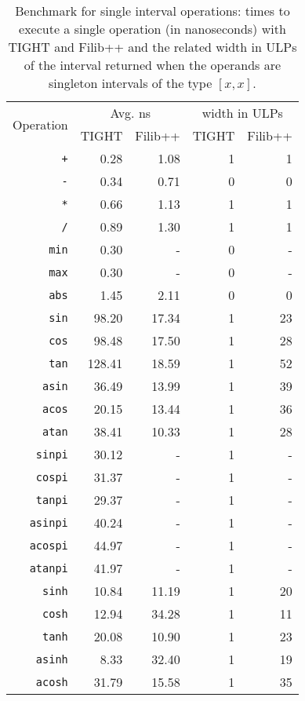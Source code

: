 
\begin{table}
\centering
\label{table:benchmarks}
\caption{Benchmark for single interval operations: times to execute a single operation (in nanoseconds) with TIGHT and Filib++ and the related width in ULPs of the interval returned when the operands are singleton intervals of the type $[x,x]$.}
\begin{tabular}{r|rr|rr}
\multirow{2}{*}{Operation} & \multicolumn{2}{c|}{Avg. ns} & \multicolumn{2}{c}{width in ULPs} \\
& TIGHT & Filib++ & TIGHT & Filib++ \\
\hline
\texttt{+} & 0.28 & 1.08 & 1 & 1 \\
\texttt{-} & 0.34 & 0.71 & 0 & 0 \\
\texttt{*} & 0.66 & 1.13 & 1 & 1 \\
\texttt{/} & 0.89 & 1.30 & 1 & 1 \\
\texttt{min} & 0.30 & - & 0 & - \\
\texttt{max} & 0.30 & - & 0 & - \\
\texttt{abs} & 1.45 & 2.11 & 0 & 0 \\
\texttt{sin} & 98.20 & 17.34 & 1 & 23 \\
\texttt{cos} & 98.48 & 17.50 & 1 & 28 \\
\texttt{tan} & 128.41 & 18.59 & 1 & 52 \\
\texttt{asin} & 36.49 & 13.99 & 1 & 39 \\
\texttt{acos} & 20.15 & 13.44 & 1 & 36 \\
\texttt{atan} & 38.41 & 10.33 & 1 & 28 \\
\texttt{sinpi} & 30.12 & - & 1 & - \\
\texttt{cospi} & 31.37 & - & 1 & - \\
\texttt{tanpi} & 29.37 & - & 1 & - \\
\texttt{asinpi} & 40.24 & - & 1 & - \\
\texttt{acospi} & 44.97 & - & 1 & - \\
\texttt{atanpi} & 41.97 & - & 1 & - \\
\texttt{sinh} & 10.84 & 11.19 & 1 & 20 \\
\texttt{cosh} & 12.94 & 34.28 & 1 & 11 \\
\texttt{tanh} & 20.08 & 10.90 & 1 & 23 \\
\texttt{asinh} & 8.33 & 32.40 & 1 & 19 \\
\texttt{acosh} & 31.79 & 15.58 & 1 & 35 \\

\end{tabular}
\end{table}
